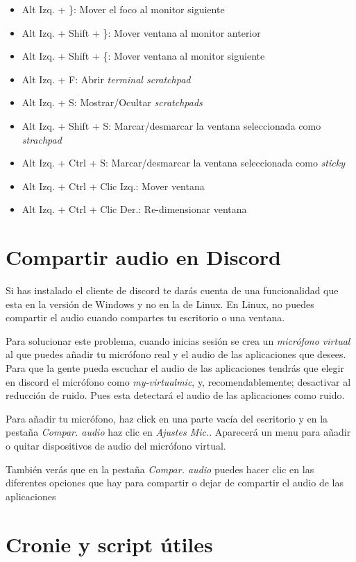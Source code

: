 \documentclass[12pt]{article}
\begin{document}
\begin{itemize}
\item Alt Izq. + \}: Mover el foco al monitor siguiente
\item Alt Izq. + Shift + \}: Mover ventana al monitor anterior
\item Alt Izq. + Shift + \{: Mover ventana al monitor siguiente
\item Alt Izq. + F: Abrir \emph{terminal scratchpad}
\item Alt Izq. + S: Mostrar/Ocultar \emph{scratchpads}
\item Alt Izq. + Shift + S: Marcar/desmarcar la ventana seleccionada como \emph{strachpad}
\item Alt Izq. + Ctrl + S: Marcar/desmarcar la ventana seleccionada como \emph{sticky}
\item Alt Izq. + Ctrl + Clic Izq.: Mover ventana
\item Alt Izq. + Ctrl + Clic Der.: Re-dimensionar ventana
\end{itemize}

\section{Compartir audio en Discord}

Si has instalado el cliente de discord te darás cuenta de una funcionalidad que esta en la versión de Windows y no en la de Linux. En Linux, no puedes compartir el audio cuando compartes tu escritorio o una ventana.

Para solucionar este problema, cuando inicias sesión se crea un \emph{micrófono virtual} al que puedes añadir tu micrófono real y el audio de las aplicaciones que desees. Para que la gente pueda escuchar el audio de las aplicaciones tendrás que elegir en discord el micrófono como \emph{my-virtualmic}, y, recomendablemente; desactivar al reducción de ruido. Pues esta detectará el audio de las aplicaciones como ruido.

Para añadir tu micrófono, haz click en una parte vacía del escritorio y en la pestaña \emph{Compar. audio} haz clic en \emph{Ajustes Mic.}. Aparecerá un menu para añadir o quitar dispositivos de audio del micrófono virtual.

También verás que en la pestaña \emph{Compar. audio} puedes hacer clic en las diferentes opciones que hay para compartir o dejar de compartir el audio de las aplicaciones

\section{Cronie y script útiles}
\end{document}

